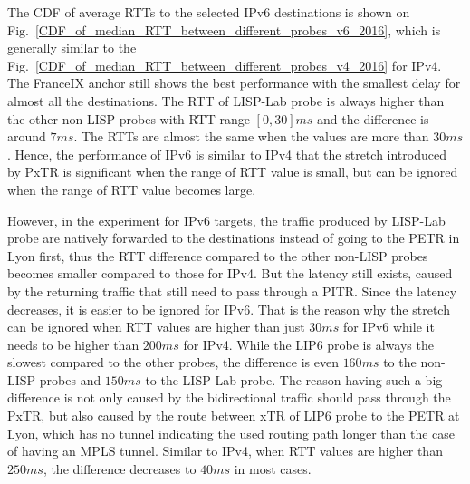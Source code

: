 The CDF of average RTTs to the selected IPv6 destinations is shown on Fig.~\ref{CDF_of_median_RTT_between_different_probes_v6_2016}, which is generally similar to the Fig.~\ref{CDF_of_median_RTT_between_different_probes_v4_2016} for IPv4. The FranceIX anchor still shows the best performance with the smallest delay for almost all the destinations. The RTT of LISP-Lab probe is always higher than the other non-LISP probes with RTT range $[0, 30]ms$ and the difference is around $7 ms$. The RTTs are almost the same when the values are more than $30 ms$. Hence, the performance of IPv6 is similar to IPv4 that the stretch introduced by PxTR is significant when the range of RTT value is small, but can be ignored when the range of RTT value becomes large. 

However, in the experiment for IPv6 targets, the traffic produced by LISP-Lab probe are natively forwarded to the destinations instead of going to the PETR in Lyon first, thus the RTT difference compared to the other non-LISP probes becomes smaller compared to those for IPv4. But the latency still exists, caused by the returning traffic that still need to pass through a PITR. Since the latency decreases, it is easier to be ignored for IPv6. That is the reason why the stretch can be ignored when RTT values are higher than just $30ms$ for IPv6 while it needs to be higher than $200ms$ for IPv4. While the LIP6 probe is always the slowest compared to the other probes, the difference is even $160ms$ to the non-LISP probes and $150ms$ to the LISP-Lab probe. The reason having such a big difference is not only caused by the bidirectional traffic should pass through the PxTR, but also caused by the route between xTR of LIP6 probe to the PETR at Lyon, which has no tunnel indicating the used routing path longer than the case of having an MPLS tunnel. Similar to IPv4, when RTT values are higher than $250ms$, the difference decreases to $40ms$ in most cases.

